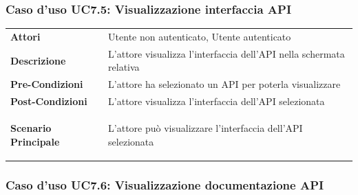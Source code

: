 \subsubsection{Caso d'uso UC7.5: Visualizzazione interfaccia API}
\label{UC7_5}

\begin{minipage}{\linewidth}
	\begin{tabular}{ l | p{11cm}}
		\hline
		\rowcolor{Gray}
		\multicolumn{2}{c}{UC7.5 - Visualizzazione interfaccia API} \\
		\hline
		\textbf{Attori} & Utente non autenticato, Utente autenticato \\
		\textbf{Descrizione} & L'attore visualizza l'interfaccia dell'API nella schermata relativa\\
		\textbf{Pre-Condizioni} & L'attore ha selezionato un API per poterla visualizzare\\
		\textbf{Post-Condizioni} & L'attore visualizza l'interfaccia dell'API selezionata \\
		\textbf{Scenario Principale} & 
		\begin{enumerate*}[label=(\arabic*.),itemjoin={\newline}]
			\item L'attore può visualizzare l'interfaccia dell'API selezionata
		\end{enumerate*}\\
	\end{tabular}
\end{minipage}

\subsubsection{Caso d'uso UC7.6: Visualizzazione documentazione API}
\label{UC7_6}

